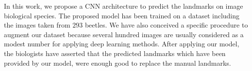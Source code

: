 \documentclass[review]{elsarticle}
\begin{document}
 


In this work, we propose a CNN architecture to predict the landmarks on image biological species. The proposed model has been trained on a dataset including the images taken from $293$ beetles. We have also conceived a specific procedure to augment our dataset because several hundred images are usually considered as a modest number for applying deep learning methods. After applying our model, the biologists have asserted that the predicted landmarks which have been provided by our model, were enough good to replace the manual landmarks.
\end{document}
